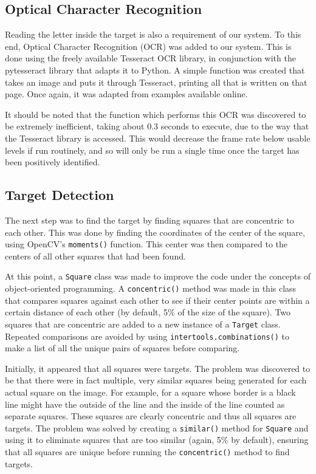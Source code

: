\documentclass[11pt]{article}
\begin{document}
\subsection{Optical Character Recognition}
Reading the letter inside the target is also a requirement of our system. To this end, Optical Character Recognition (OCR) was added to our system. This is done using the freely available Tesseract OCR library, in conjunction with the pytesseract library that adapts it to Python. A simple function was created that takes an image and puts it through Tesseract, printing all that is written on that page. Once again, it was adapted from examples available online\cite{pyimagesearch_ocr}.

It should be noted that the function which performs this OCR was discovered to be extremely inefficient, taking about 0.3 seconds to execute, due to the way that the Tesseract library is accessed. This would decrease the frame rate below usable levels if run routinely, and so will only be run a single time once the target has been positively identified.

\subsection{Target Detection}
The next step was to find the target by finding squares that are concentric to each other. This was done by finding the coordinates of the center of the square, using OpenCV's \lstinline|moments()| function. This center was then compared to the centers of all other squares that had been found.

At this point, a \lstinline|Square| class was made to improve the code under the concepts of object-oriented programming. A \lstinline|concentric()| method was made in this class that compares squares against each other to see if their center points are within a certain distance of each other (by default, 5\% of the size of the square). Two squares that are concentric are added to a new instance of a \lstinline|Target| class. Repeated comparisons are avoided by using \lstinline|intertools.combinations()| to make a list of all the unique pairs of squares before comparing.

Initially, it appeared that all squares were targets. The problem was discovered to be that there were in fact multiple, very similar squares being generated for each actual square on the image. For example, for a square whose border is a black line might have the outside of the line and the inside of the line counted as separate squares. These squares are clearly concentric and thus all squares are targets. The problem was solved by creating a \lstinline|similar()| method for \lstinline|Square| and using it to eliminate squares that are too similar (again, 5\% by default), ensuring that all squares are unique before running the \lstinline|concentric()| method to find targets.
\end{document}

